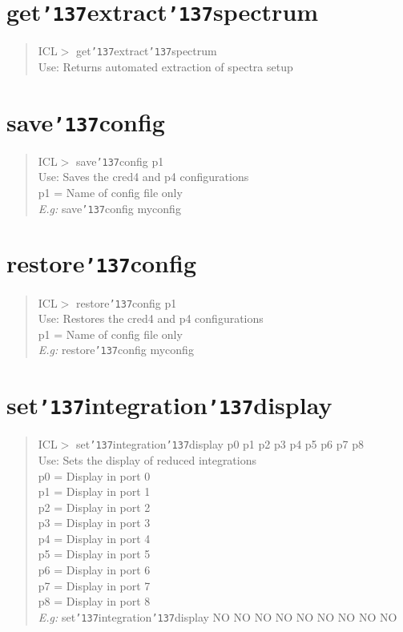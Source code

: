 \documentclass[a4paper]{book}
\renewcommand{\_}{{\tt\char'137}}
\begin{document}
\section{get\_extract\_spectrum}
\begin{quote}
ICL$>$ get\_extract\_spectrum \\
Use: Returns automated extraction of spectra setup
\end{quote}
\section{save\_config}
\begin{quote}
ICL$>$ save\_config p1 \\
Use: Saves the cred4 and p4 configurations \\
p1 = Name of config file only \\
{\em E.g:} save\_config myconfig
\end{quote}
\section{restore\_config}
\begin{quote}
ICL$>$ restore\_config p1 \\
Use: Restores the cred4 and p4 configurations \\
p1 = Name of config file only \\
{\em E.g:} restore\_config myconfig
\end{quote}
\section{set\_integration\_display}
\label{set_int_display}
\begin{quote}
ICL$>$ set\_integration\_display p0 p1 p2 p3 p4 p5 p6 p7 p8 \\
Use: Sets the display of reduced integrations \\
p0 = Display in port 0 \\
p1 = Display in port 1 \\
p2 = Display in port 2 \\
p3 = Display in port 3 \\
p4 = Display in port 4 \\
p5 = Display in port 5 \\
p6 = Display in port 6 \\
p7 = Display in port 7 \\
p8 = Display in port 8 \\
{\em E.g:} set\_integration\_display NO NO NO NO NO NO NO NO NO
\end{quote}
\end{document}
